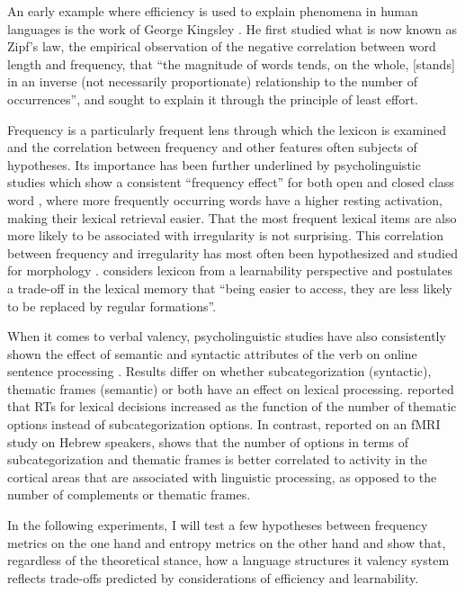 An early example where efficiency is used to explain phenomena in human languages is the work of George Kingsley \citet{zipf1935,zipf1949}. He first studied what is now known as Zipf's law, the empirical observation of the negative correlation between word length and frequency, that ``the magnitude of words tends, on the whole, [stands] in an inverse (not necessarily proportionate) relationship to the number of occurrences'', and sought to explain it through the principle of least effort.

Frequency is a particularly frequent lens through which the lexicon is examined and the correlation between frequency and other features often subjects of hypotheses. Its importance has been further underlined by psycholinguistic studies which show a consistent ``frequency effect'' for both open and closed class word \citep{segui1982,marslen-wilson1990}, where more frequently occurring words have a higher resting activation, making their lexical retrieval easier. That the most frequent lexical items are also more likely to be associated with irregularity is not surprising. This correlation between frequency and irregularity has most often been hypothesized and studied for morphology \citet{wu2019}. \citet{bybee1998} considers lexicon from a learnability perspective and postulates a trade-off in the lexical memory that ``being easier to access, they are less likely to be replaced by regular formations''. 

When it comes to verbal valency, psycholinguistic studies have also consistently shown the effect of semantic and syntactic attributes of the verb on online sentence processing \citep{shapiro1987,collina2001}. Results differ on whether subcategorization (syntactic), thematic frames (semantic) or both have an effect on lexical processing. \citet{shapiro1987} reported that RTs for lexical decisions increased as the function of the number of thematic options instead of subcategorization options. In contrast, \citet{shetreet2007} reported on an fMRI study on Hebrew speakers, shows that the number of options in terms of subcategorization and thematic frames is better correlated to activity in the cortical areas that are associated with linguistic processing, as opposed to the number of complements or thematic frames.

In the following experiments, I will test a few hypotheses between frequency metrics on the one hand and entropy metrics on the other hand and show that, regardless of the theoretical stance, how a language structures it valency system reflects trade-offs predicted by considerations of efficiency and learnability.

